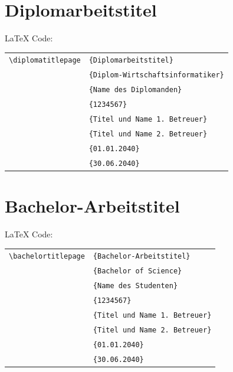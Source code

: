 \documentclass[english, trackchanges, hyperref, ngerman ,pdf, mp, mppdf]{wise}
\newcommand\code[1]{\texttt{#1}}
\newcommand\command[1]{\code{\textbackslash{}#1}}
\begin{document}
\begin{appendix}
\begin{appendices}
\clearpage



\section{Diplomarbeitstitel}\label{sec:titelblatt_diplomarbeiten}

\LaTeX{} Code:

\vspace{0.375cm}
\begin{center}\begin{tabular}{ll}
\command{diplomatitlepage}&
\code{\{Diplomarbeitstitel\}}\\
&
\code{\{Diplom-Wirtschaftsinformatiker\}}\\
&
\code{\{Name des Diplomanden\}}\\
&
\code{\{1234567\}}\\
&
\code{\{Titel und Name 1. Betreuer\}}\\
&
\code{\{Titel und Name 2. Betreuer\}}\\
&
\code{\{01.01.2040\}}\\
&
\code{\{30.06.2040\}}\\
\end{tabular}\end{center}
\vspace{0.375cm}

\clearpage


\section{Bachelor-Arbeitstitel}\label{sec:titelblatt_bachelorarbeiten}

\LaTeX{} Code:

\vspace{0.375cm}
\begin{center}\begin{tabular}{ll}
\command{bachelortitlepage}&
\code{\{Bachelor-Arbeitstitel\}}\\
&
\code{\{Bachelor of Science\}}\\
&
\code{\{Name des Studenten\}}\\
&
\code{\{1234567\}}\\
&
\code{\{Titel und Name 1. Betreuer\}}\\
&
\code{\{Titel und Name 2. Betreuer\}}\\
&
\code{\{01.01.2040\}}\\
&
\code{\{30.06.2040\}}\\
\end{tabular}\end{center}
\vspace{0.375cm}


\end{appendices}
\end{appendix}
\end{document}
